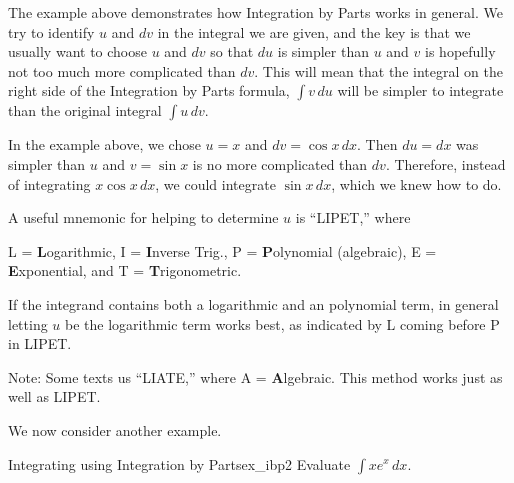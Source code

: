 The example above demonstrates how Integration by Parts works in general.  We try to identify $u$ and $dv$ in the integral we are given, and the key is that we usually want to choose $u$ and $dv$ so that $du$ is simpler than $u$ and $v$ is hopefully not too much more complicated than $dv$.  This will mean that the integral on the right side of the Integration by Parts formula, $\int v\,du$ will be simpler to integrate than the original integral $\int u\,dv$.

In the example above, we chose $u=x$ and $dv=\cos x\,dx$.  Then $du=dx$ was simpler than $u$ and $v=\sin x$ is no more complicated than $dv$.  Therefore, instead of integrating $x\cos x \,dx$, we could integrate $\sin x\,dx$, which we knew how to do.

A useful mnemonic for helping to determine $u$ is ``LIPET,'' where 
\begin{center}L = \textbf{L}ogarithmic, I = \textbf{I}nverse Trig., P = \textbf{P}olynomial (algebraic), E = \textbf{E}xponential, and T = \textbf{T}rigonometric.
\end{center}

If the integrand contains both a logarithmic and an polynomial term, in general letting $u$ be the logarithmic term works best, as indicated by L coming before P in LIPET.

Note: Some texts us ``LIATE,'' where A = \textbf{A}lgebraic. This method works just as well as LIPET.


%	
%

We now consider another example.\\

\begin{example}{Integrating using Integration by Parts}{ex_ibp2}
	{
	Evaluate $\displaystyle \int x e^x\,dx$.}	
\end{example}

